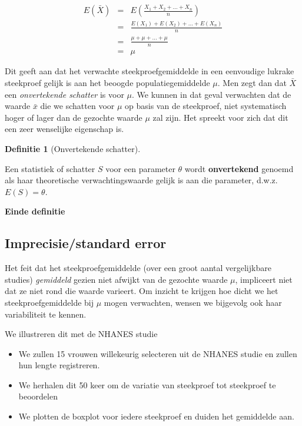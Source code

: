 \documentclass[
  12pt,dutch,coursenotes]{book}
\providecommand{\tightlist}{%
  \setlength{\itemsep}{0pt}\setlength{\parskip}{0pt}}
\theoremstyle{definition}
\newtheorem{definition}{Definitie}[chapter]
\theoremstyle{definition}
\theoremstyle{definition}
\theoremstyle{definition}
\theoremstyle{remark}
\begin{document}
\begin{eqnarray*}
E(\bar X) &=& E \left(\frac{X_1+ X_2+ ... + X_n}{n}\right) \\
&= & \frac{E(X_1)+ E(X_2)+ ... + E(X_n)}{n} \\
&=& \frac{\mu + \mu + ... +\mu}{n} \\
&= & \mu
\end{eqnarray*}

Dit geeft aan dat het verwachte steekproefgemiddelde in een eenvoudige
lukrake steekproef gelijk is aan het beoogde populatiegemiddelde \(\mu\). Men
zegt dan dat \(\bar X\) een \emph{onvertekende schatter} is voor \(\mu\). We kunnen in
dat geval verwachten dat de waarde \(\bar x\) die we schatten voor \(\mu\) op
basis van de steekproef, niet systematisch hoger of lager dan de gezochte waarde \(\mu\) zal zijn. Het spreekt voor zich dat dit een zeer wenselijke eigenschap is.

\begin{definition}[Onvertekende schatter]
\protect\hypertarget{def:unnamed-chunk-128}{}{\label{def:unnamed-chunk-128} {} }
\end{definition}
Een statistiek of schatter \(S\) voor een
parameter \(\theta\) wordt \textbf{onvertekend} genoemd als haar theoretische
verwachtingswaarde gelijk is aan die parameter, d.w.z. \(E(S)= \theta\).

\textbf{Einde definitie}

\hypertarget{imprecisiestandard-error}{%
\subsection{Imprecisie/standard error}\label{imprecisiestandard-error}}

Het feit dat het steekproefgemiddelde (over een groot aantal vergelijkbare studies) \emph{gemiddeld} gezien niet afwijkt van de gezochte waarde \(\mu\), impliceert niet dat ze niet rond die waarde varieert.
Om inzicht te krijgen hoe dicht we het steekproefgemiddelde bij \(\mu\) mogen verwachten, wensen we bijgevolg ook haar variabiliteit te kennen.

We illustreren dit met de NHANES studie

\begin{itemize}
\tightlist
\item
  We zullen 15 vrouwen willekeurig selecteren uit de NHANES studie en zullen hun lengte registreren.
\item
  We herhalen dit 50 keer om de variatie van steekproef tot steekproef te beoordelen
\item
  We plotten de boxplot voor iedere steekproef en duiden het gemiddelde aan.
\end{itemize}
\end{document}
